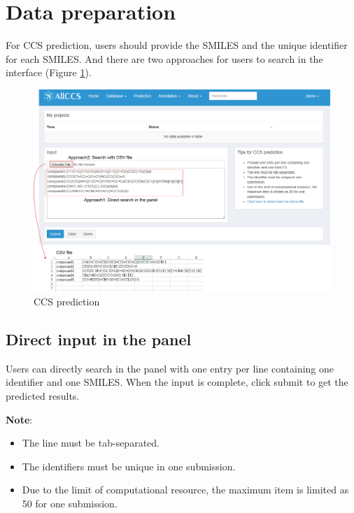 \documentclass[12pt,]{book}
\providecommand{\tightlist}{%
  \setlength{\itemsep}{0pt}\setlength{\parskip}{0pt}}
\begin{document}
\section{Data preparation}\label{chapter3d1}

For CCS prediction, users should provide the SMILES and the unique
identifier for each SMILES. And there are two approaches for users to
search in the interface (Figure \ref{fig:figure3d1}).

\begin{figure}

{\centering \includegraphics{images/chapter3/figure3.1prediction} 

}

\caption{CCS prediction}\label{fig:figure3d1}
\end{figure}

\subsection{Direct input in the panel}\label{chapter3d1d1}

Users can directly search in the panel with one entry per line
containing one identifier and one SMILES. When the input is complete,
click submit to get the predicted results.

\textbf{Note}:

\begin{itemize}
\tightlist
\item
  The line must be tab-separated.
\item
  The identifiers must be unique in one submission.
\item
  Due to the limit of computational resource, the maximum item is
  limited as 50 for one submission.
\end{itemize}
\end{document}
